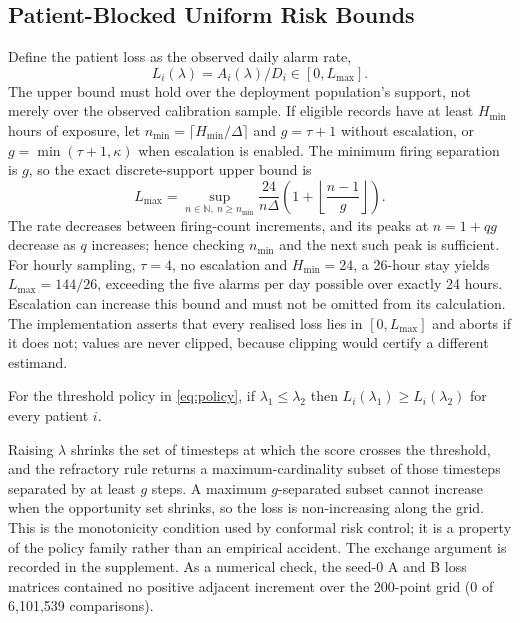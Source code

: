 \subsection{Patient-Blocked Uniform Risk Bounds}

Define the patient loss as the observed daily alarm rate,
\begin{equation}
\label{eq:blockloss}
L_i(\lambda)=A_i(\lambda)/D_i\in[0,L_{\max}].
\end{equation}
The upper bound must hold over the deployment population's support, not merely over the observed calibration sample. If eligible records have at least $H_{\min}$ hours of exposure, let $n_{\min}=\lceil H_{\min}/\Delta\rceil$ and $g=\tau+1$ without escalation, or $g=\min(\tau+1,\kappa)$ when escalation is enabled. The minimum firing separation is $g$, so the exact discrete-support upper bound is
\begin{equation}
\label{eq:lmax}
L_{\max}=\sup_{n\in\mathbb{N},\ n\ge n_{\min}}
 \frac{24}{n\Delta}\left(1+\left\lfloor\frac{n-1}{g}\right\rfloor\right).
\end{equation}
The rate decreases between firing-count increments, and its peaks at $n=1+qg$ decrease as $q$ increases; hence checking $n_{\min}$ and the next such peak is sufficient. For hourly sampling, $\tau=4$, no escalation and $H_{\min}=24$, a 26-hour stay yields $L_{\max}=144/26$, exceeding the five alarms per day possible over exactly 24 hours. Escalation can increase this bound and must not be omitted from its calculation. The implementation asserts that every realised loss lies in $[0,L_{\max}]$ and aborts if it does not; values are never clipped, because clipping would certify a different estimand.

\begin{lemma}
\label{lem:monotone}
For the threshold policy in \cref{eq:policy}, if $\lambda_1\le\lambda_2$ then $L_i(\lambda_1)\ge L_i(\lambda_2)$ for every patient $i$.
\end{lemma}
Raising $\lambda$ shrinks the set of timesteps at which the score crosses the threshold, and the refractory rule returns a maximum-cardinality subset of those timesteps separated by at least $g$ steps. A maximum $g$-separated subset cannot increase when the opportunity set shrinks, so the loss is non-increasing along the grid. This is the monotonicity condition used by conformal risk control; it is a property of the policy family rather than an empirical accident. The exchange argument is recorded in the supplement. As a numerical check, the seed-0 A and B loss matrices contained no positive adjacent increment over the 200-point grid (0 of 6{,}101{,}539 comparisons).

